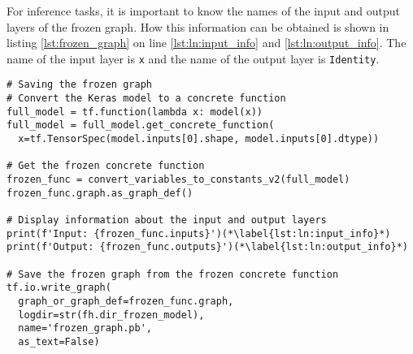 For inference tasks, it is important to know the names of the input and output layers of the frozen graph.
How this information can be obtained is shown in listing \ref{lst:frozen_graph} on line \ref{lst:ln:input_info} and \ref{lst:ln:output_info}.
The name of the input layer is \texttt{x} and the name of the output layer is \texttt{Identity}.

\clearpage

\begin{lstlisting}[style=python, caption={Saving the model in the frozen graph file format \cite{}}, label=lst:frozen_graph]
# Saving the frozen graph
# Convert the Keras model to a concrete function
full_model = tf.function(lambda x: model(x))
full_model = full_model.get_concrete_function(
  x=tf.TensorSpec(model.inputs[0].shape, model.inputs[0].dtype))

# Get the frozen concrete function
frozen_func = convert_variables_to_constants_v2(full_model)
frozen_func.graph.as_graph_def()

# Display information about the input and output layers
print(f'Input: {frozen_func.inputs}')(*\label{lst:ln:input_info}*)
print(f'Output: {frozen_func.outputs}')(*\label{lst:ln:output_info}*)

# Save the frozen graph from the frozen concrete function
tf.io.write_graph(
  graph_or_graph_def=frozen_func.graph,
  logdir=str(fh.dir_frozen_model),
  name='frozen_graph.pb',
  as_text=False)
\end{lstlisting}
